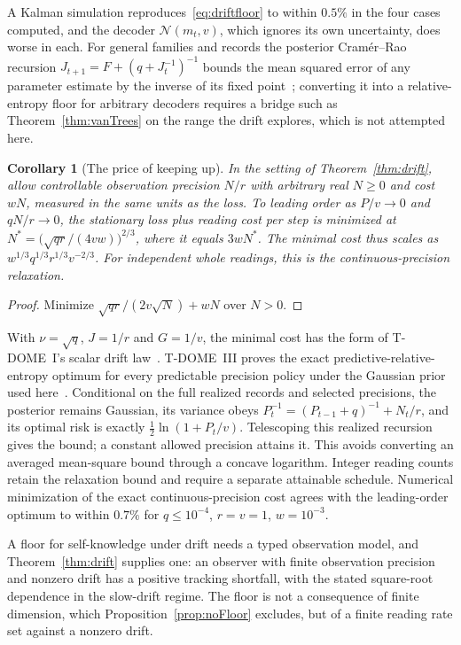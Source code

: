 \documentclass[12pt]{article}
\newtheorem{corollary}[theorem]{Corollary}
\theoremstyle{definition}
\theoremstyle{remark}
\begin{document}
A Kalman simulation reproduces~\eqref{eq:driftfloor} to within $0.5\%$ in the four cases computed, and the decoder $\mathcal N(m_t,v)$, which ignores its own uncertainty, does worse in each. For general families and records the posterior Cram\'er--Rao recursion $J_{t+1}=F+(q+J_t^{-1})^{-1}$ bounds the mean squared error of any parameter estimate by the inverse of its fixed point~\cite{Tichavsky1998}; converting it into a relative-entropy floor for arbitrary decoders requires a bridge such as Theorem~\ref{thm:vanTrees} on the range the drift explores, which is not attempted here.

\begin{corollary}[The price of keeping up]\label{cor:price}
In the setting of Theorem~\ref{thm:drift}, allow controllable observation precision $N/r$ with arbitrary real $N\ge0$ and cost $wN$, measured in the same units as the loss. To leading order as $P/v\to0$ and $qN/r\to0$, the stationary loss plus reading cost per step is minimized at $N^*=\bigl(\sqrt{qr}/(4vw)\bigr)^{2/3}$, where it equals $3wN^*$. The minimal cost thus scales as $w^{1/3}q^{1/3}r^{1/3}v^{-2/3}$. For independent whole readings, this is the continuous-precision relaxation.
\end{corollary}

\begin{proof}
Minimize $\sqrt{qr}/(2v\sqrt N)+wN$ over $N>0$.
\end{proof}

With $\nu=\sqrt q$, $J=1/r$ and $G=1/v$, the minimal cost has the form of T-DOME~I's scalar drift law~\cite{TDOMEI}. T-DOME~III proves the exact predictive-relative-entropy optimum for every predictable precision policy under the Gaussian prior used here~\cite{TDOMEIII}. Conditional on the full realized records and selected precisions, the posterior remains Gaussian, its variance obeys $P_t^{-1}=(P_{t-1}+q)^{-1}+N_t/r$, and its optimal risk is exactly $\tfrac12\ln(1+P_t/v)$. Telescoping this realized recursion gives the bound; a constant allowed precision attains it. This avoids converting an averaged mean-square bound through a concave logarithm. Integer reading counts retain the relaxation bound and require a separate attainable schedule. Numerical minimization of the exact continuous-precision cost agrees with the leading-order optimum to within $0.7\%$ for $q\le10^{-4}$, $r=v=1$, $w=10^{-3}$.

A floor for self-knowledge under drift needs a typed observation model, and Theorem~\ref{thm:drift} supplies one: an observer with finite observation precision and nonzero drift has a positive tracking shortfall, with the stated square-root dependence in the slow-drift regime. The floor is not a consequence of finite dimension, which Proposition~\ref{prop:noFloor} excludes, but of a finite reading rate set against a nonzero drift.
\end{document}
